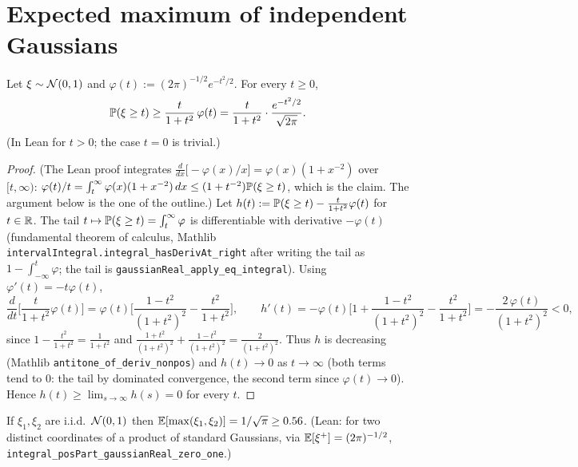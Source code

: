 \section{Expected maximum of independent Gaussians}
\label{sec:pre_sudakov_max}

\begin{lemma}\label{lem:gauss_tail_lower}
\leanok
Let $\xi\sim\mathcal{N}(0,1)$ and $\varphi(t) := (2\pi)^{-1/2}e^{-t^2/2}$. For every $t \ge 0$,
\[
  \mathbb{P}(\xi\ge t) \ge \frac{t}{1+t^2}\,\varphi(t) = \frac{t}{1+t^2}\cdot\frac{e^{-t^2/2}}{\sqrt{2\pi}} .
\]
(In Lean for $t > 0$; the case $t = 0$ is trivial.)
\end{lemma}

\begin{proof}
\leanok
(The Lean proof integrates $\frac{d}{dx}\big[-\varphi(x)/x\big] = \varphi(x)(1 + x^{-2})$ over
$[t,\infty)$: $\varphi(t)/t = \int_t^\infty\varphi(x)(1+x^{-2})\,dx \le (1+t^{-2})\mathbb{P}(\xi\ge t)$,
which is the claim. The argument below is the one of the outline.)
Let $h(t) := \mathbb{P}(\xi\ge t) - \frac{t}{1+t^2}\varphi(t)$ for $t\in\mathbb{R}$. The tail
$t\mapsto\mathbb{P}(\xi\ge t) = \int_t^\infty\varphi$ is differentiable with derivative $-\varphi(t)$
(fundamental theorem of calculus, Mathlib \texttt{intervalIntegral.integral\_hasDerivAt\_right}
after writing the tail as $1 - \int_{-\infty}^t\varphi$; the tail is
\texttt{gaussianReal\_apply\_eq\_integral}). Using $\varphi'(t) = -t\varphi(t)$,
\[
  \frac{d}{dt}\Big[\frac{t}{1+t^2}\varphi(t)\Big]
  = \varphi(t)\Big[\frac{1-t^2}{(1+t^2)^2} - \frac{t^2}{1+t^2}\Big],
  \qquad
  h'(t) = -\varphi(t)\Big[1 + \frac{1-t^2}{(1+t^2)^2} - \frac{t^2}{1+t^2}\Big]
  = -\frac{2\,\varphi(t)}{(1+t^2)^2} < 0,
\]
since $1 - \frac{t^2}{1+t^2} = \frac{1}{1+t^2}$ and $\frac{1+t^2}{(1+t^2)^2} + \frac{1-t^2}{(1+t^2)^2} = \frac{2}{(1+t^2)^2}$.
Thus $h$ is decreasing (Mathlib \texttt{antitone\_of\_deriv\_nonpos}) and
$h(t)\to 0$ as $t\to\infty$ (both terms tend to $0$: the tail by dominated convergence, the
second term since $\varphi(t)\to 0$). Hence $h(t) \ge \lim_{s\to\infty}h(s) = 0$ for every $t$.
\end{proof}

\begin{lemma}\label{lem:psf_max_two}
\leanok
{}
If $\xi_1,\xi_2$ are i.i.d.\ $\mathcal{N}(0,1)$ then $\mathbb{E}[\max(\xi_1,\xi_2)] = 1/\sqrt\pi \ge 0.56$.
(Lean: for two distinct coordinates of a product of standard Gaussians, via
$\mathbb{E}[\xi^+] = (2\pi)^{-1/2}$, \texttt{integral\_posPart\_gaussianReal\_zero\_one}.)
\end{lemma}

